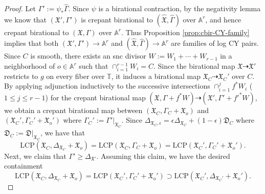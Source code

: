 \documentclass[reqno, 12pt]{amsart}
\theoremstyle{definition}
\newcommand{\bA}{\mathbb{A}}
\newcommand{\bT}{\mathbb{T}}
\newcommand{\fX}{\mathfrak{X}}
\newcommand{\fD}{\mathfrak{D}}
\newcommand{\hfX}{\widehat{\mathfrak{X}}}
\newcommand{\hfP}{\widehat{\mathfrak{P}}}
\newcommand{\hGamma}{\widehat{\Gamma}}
\newcommand{\LCP}{\mathrm{LCP}}
\newcommand{\rma}{\mathrm{a}}
\numberwithin{equation}{section}
\begin{document}
\begin{proof}

Let $\Gamma':=\psi_* \hGamma$. Since $\psi$ is a birational contraction, by the negativity lemma we know that $ (\fX', \Gamma')$ is crepant birational to $(\hfX, \hGamma)$ over $\bA^r$, and hence crepant birational to $(\fX, \Gamma)$ over $\bA^r$. Thus Proposition \ref{prop:cbir-CY-family} implies that both $(\fX',\Gamma')\to \bA^r$ and $(\hfX,\hGamma)\to \bA^r$ are families of log CY pairs.
Since $C$ is smooth, there exists an snc divisor $W:=W_1+\cdots+ W_{r-1}$ in a neighborhood of $o\in \bA^r$ such that $\cap_{i=1}^{r-1} W_i = C$. Since the birational map $\fX\dashrightarrow \fX'$ restricts to $g$ on every fiber over $\bT$, it induces a birational map $\fX_C \dashrightarrow \fX_C'$ over $C$. By applying adjunction inductively to   the successive intersections $\cap_{i=1}^j f^* W_i$ ($1\leq j\leq r-1$) for the crepant birational map $(\fX, \Gamma + f^*W)\dashrightarrow (\fX', \Gamma'+f'^* W)$, we obtain a crepant birational map  between $(\fX_C, \Gamma_C + \fX_o)$ and $(\fX_C', \Gamma_C' + \fX_o')$ where $\Gamma_C':=\Gamma'|_{\fX_C}$. Since $\Delta_{\fX_C,\epsilon} =\epsilon \Delta_{\fX_C} + (1-\epsilon) \fD_{C} $ where $\fD_{C}:= \fD|_{\fX_C}$, we have that 
\[
\LCP(\fX_C, \Delta_{\fX_C} + \fX_o) = \LCP(\fX_C, \Gamma_C + \fX_o)= \LCP(\fX_C', \Gamma_C' + \fX_o').
\]
Next, we claim that $\Gamma'\geq \Delta_{\fX'}$. 
Assuming this claim, we have the desired containment
\[
\LCP(\fX_C, \Delta_{\fX_C} + \fX_o) = \LCP(\fX_C', \Gamma_C' + \fX_o')\supset \LCP(\fX_C', \Delta_{\fX_C'} + \fX_o').
\]


\end{proof}
\end{document}
